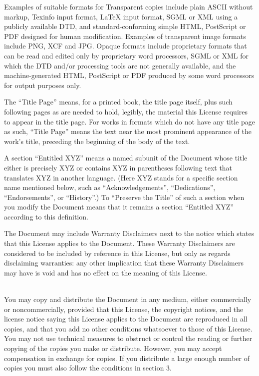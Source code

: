 Examples of suitable formats for Transparent copies include plain ASCII without markup, Texinfo input format, LaTeX input format, SGML or XML using a publicly available DTD, and standard-conforming simple HTML, PostScript or PDF designed for human modification.  Examples of transparent image formats include PNG, XCF and JPG.  Opaque formats include proprietary formats that can be read and edited only by proprietary word processors, SGML or XML for which the DTD and/or processing tools are not generally available, and the machine-generated HTML, PostScript or PDF produced by some word processors for output purposes only.

The "`Title Page"' means, for a printed book, the title page itself, plus such following pages as are needed to hold, legibly, the material this License requires to appear in the title page.  For works in formats which do not have any title page as such, "`Title Page"' means the text near the most prominent appearance of the work's title, preceding the beginning of the body of the text.

A section "`Entitled XYZ"' means a named subunit of the Document whose title either is precisely XYZ or contains XYZ in parentheses following text that translates XYZ in another language.  (Here XYZ stands for a specific section name mentioned below, such as "`Acknowledgements"', "`Dedications"', "`Endorsements"', or "`History"'.)  To "`Preserve the Title"' of such a section when you modify the Document means that it remains a section "`Entitled XYZ"' according to this definition.

The Document may include Warranty Disclaimers next to the notice which states that this License applies to the Document.  These Warranty Disclaimers are considered to be included by reference in this License, but only as regards disclaiming warranties: any other implication that these Warranty Disclaimers may have is void and has no effect on the meaning of this License.


\bigskip{}\\

\noindent
You may copy and distribute the Document in any medium, either commercially or noncommercially, provided that this License, the copyright notices, and the license notice saying this License applies to the Document are reproduced in all copies, and that you add no other conditions whatsoever to those of this License.  You may not use technical measures to obstruct or control the reading or further copying of the copies you make or distribute.  However, you may accept compensation in exchange for copies.  If you distribute a large enough number of copies you must also follow the conditions in section 3.

